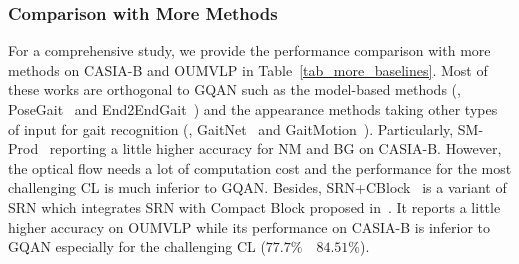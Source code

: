 \subsubsection{Comparison with More Methods}
For a comprehensive study, we provide the performance comparison with more methods on CASIA-B and OUMVLP in Table~\ref{tab_more_baselines}.
%
Most of these works are orthogonal to GQAN such as the model-based methods (\eg, PoseGait~\cite{liao2020model} and End2EndGait~\cite{li2020end}) and the appearance methods taking other types of input for gait recognition (\eg, GaitNet~\cite{zhang2019gait} and GaitMotion~\cite{bashir2009gait}).
%
Particularly, SM-Prod~\cite{castro2020multimodal} reporting a little higher accuracy for NM and BG on CASIA-B. However, the optical flow needs a lot of computation cost and the performance for the most challenging CL is much inferior to GQAN.
%
Besides, SRN+CBlock~\cite{hou2021setres} is a variant of SRN which integrates SRN with Compact Block proposed in~\cite{hou2020gait}.
%
It reports a little higher accuracy on OUMVLP while its performance on CASIA-B is inferior to GQAN especially for the challenging CL ($77.7\%$~\vs~$84.51\%$).

